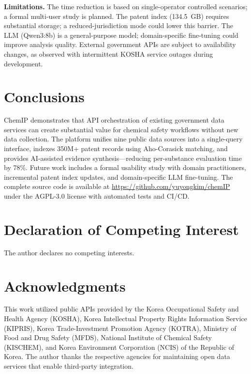 \documentclass[preprint,12pt]{elsarticle}
\begin{document}
\textbf{Limitations.}
The time reduction is based on single-operator controlled scenarios; a formal multi-user study is planned.
The patent index (134.5~GB) requires substantial storage; a reduced-jurisdiction mode could lower this barrier.
The LLM (Qwen3:8b) is a general-purpose model; domain-specific fine-tuning could improve analysis quality.
External government APIs are subject to availability changes, as observed with intermittent KOSHA service outages during development.

\section{Conclusions}
\label{sec:conclusions}

ChemIP demonstrates that API orchestration of existing government data services can create substantial value for chemical safety workflows without new data collection.
The platform unifies nine public data sources into a single-query interface, indexes 350M+ patent records using Aho-Corasick matching, and provides AI-assisted evidence synthesis---reducing per-substance evaluation time by 78\%.
Future work includes a formal usability study with domain practitioners, incremental patent index updates, and domain-specific LLM fine-tuning.
The complete source code is available at \url{https://github.com/yuyongkim/chemIP} under the AGPL-3.0 license with automated tests and CI/CD.

\section*{Declaration of Competing Interest}

The author declares no competing interests.

\section*{Acknowledgments}

This work utilized public APIs provided by the Korea Occupational Safety and Health Agency (KOSHA), Korea Intellectual Property Rights Information Service (KIPRIS), Korea Trade-Investment Promotion Agency (KOTRA), Ministry of Food and Drug Safety (MFDS), National Institute of Chemical Safety (KISCHEM), and Korea Environment Corporation (NCIS) of the Republic of Korea.
The author thanks the respective agencies for maintaining open data services that enable third-party integration.
\end{document}
